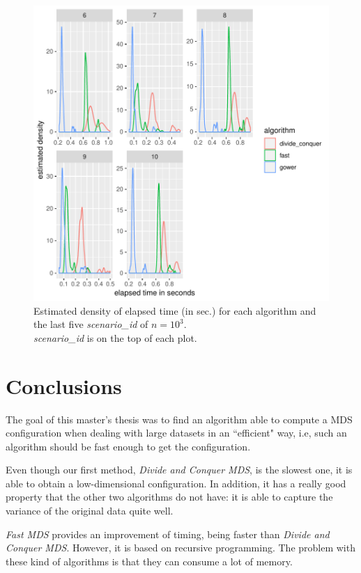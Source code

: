 \documentclass[11pt]{report}
\begin{document}
\begin{figure}[h]
\centering
    \includegraphics[scale=2]{./images/elapsed_time_1000_part2.pdf}
    \caption{
    Estimated density of elapsed time (in sec.) for each algorithm and 
    the last five \textit{scenario\_id} of $n=10^3$.\\
    \textit{scenario\_id} is on the top of each plot.
    }
    \label{elapsed_time_1000_part2}
\end{figure}


\chapter{Conclusions}
The goal of this master's thesis was to find an algorithm able to compute a MDS
configuration when dealing with large datasets in an ``efficient" way, i.e, 
such an algorithm should be fast enough to get the configuration.

\indent Even though our first method, \textit{Divide and Conquer MDS}, is
the slowest one, it is able to obtain a low-dimensional configuration. In 
addition, it has a really good property that the other two algorithms do not 
have: it is able to capture the variance of the original data quite well. 

\indent \textit{Fast MDS} provides an improvement of timing, being 
faster than \textit{Divide and Conquer MDS}. However,  it is based on 
recursive programming. The problem with these kind of algorithms is that they
can consume a lot of memory.
\end{document}
